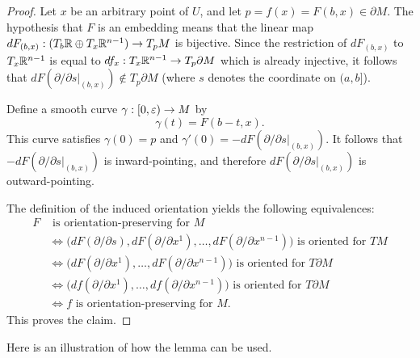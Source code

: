 \begin{proof}
Let $x$ be an arbitrary point of $U$, and let $p=f(x)=F(b,x)\in\partial M$. The hypothesis that $F$ is an embedding means that the linear map $dF_{(b,x)}:(T_b\mathbb{R}\oplus T_x\mathbb{R}^{n-1})\to T_pM$ is bijective. Since the restriction of $dF_{(b,x)}$ to $T_x\mathbb{R}^{n-1}$ is equal to $df_x:T_x\mathbb{R}^{n-1}\to T_p\partial M$ which is already injective, it follows that $dF(\partial/\partial s|_{(b,x)})\notin T_p\partial M$ (where $s$ denotes the coordinate on $(a,b]$).\par
Define a smooth curve $\gamma:[0,\varepsilon)\to M$ by
\[\gamma(t)=F(b-t,x).\]
This curve satisfies $\gamma(0)=p$ and $\gamma'(0)=-dF(\partial/\partial s|_{(b,x)})$. It follows that $-dF(\partial/\partial s|_{(b,x)})$ is inward-pointing, and therefore $dF(\partial/\partial s|_{(b,x)})$ is outward-pointing.\par
The definition of the induced orientation yields the following equivalences:
\begin{align*}
F&\text{ is orientation-preserving for $M$}\\
&\iff \text{$\big(dF(\partial/\partial s),dF(\partial/\partial x^1),\dots,dF(\partial/\partial x^{n-1})\big)$ is oriented for $TM$}\\
&\iff \text{$\big(dF(\partial/\partial x^1),\dots,dF(\partial/\partial x^{n-1})\big)$ is oriented for $T\partial M$}\\
&\iff \text{$\big(df(\partial/\partial x^1),\dots,df(\partial/\partial x^{n-1})\big)$ is oriented for $T\partial M$}\\
&\iff\text{$f$ is orientation-preserving for $M$.}
\end{align*}
This proves the claim.
\end{proof}
Here is an illustration of how the lemma can be used.
